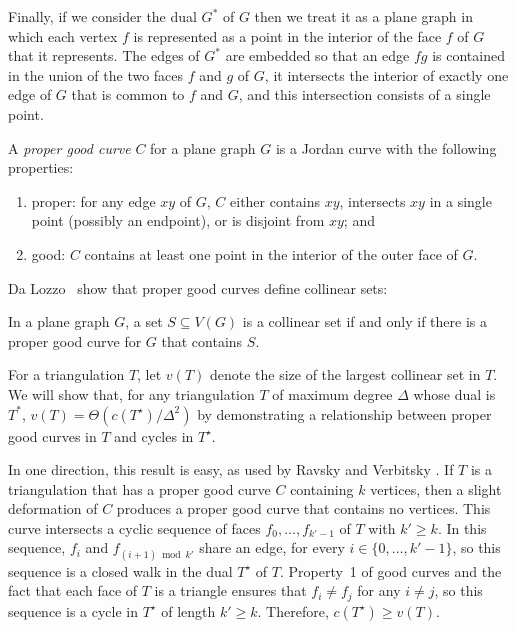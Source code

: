 \documentclass{patmorin}
\newcommand{\dual}[1]{{#1}^\star}
\begin{document}
Finally, if we consider the dual $G^*$ of $G$ then we treat it as a
plane graph in which each vertex $f$ is represented as a point in the
interior of the face $f$ of $G$ that it represents.  The edges of $G^*$
are embedded so that an edge $fg$ is contained in the union of the two
faces $f$ and $g$ of $G$, it intersects the interior of exactly one
edge of $G$ that is common to $f$ and $G$, and this intersection
consists of a single point.

A \emph{proper good curve} $C$ for a plane graph $G$ is a
Jordan curve with the following properties:
\begin{enumerate}
  \item proper: for any edge $xy$ of $G$, $C$ either contains $xy$, intersects
  $xy$ in a single point (possibly an endpoint), or is disjoint
  from $xy$; and
  \item good: $C$ contains at least one point in the interior of
  the outer face of $G$.
\end{enumerate}

Da Lozzo \etal\ show that proper good curves define collinear sets:

\begin{thm}
  In a plane graph $G$, a set $S\subseteq V(G)$ is a collinear set if
  and only if there is a proper good curve for $G$ that contains $S$.
\end{thm}

For a triangulation $T$, let $v(T)$ denote the size of the largest
collinear set in $T$.  We will show that, for any triangulation $T$
of maximum degree $\Delta$
whose dual is $T^*$, $v(T)=\Theta(c(\dual{T})/\Delta^2)$ by demonstrating a
relationship between proper good curves in $T$ and cycles in $\dual{T}$.

In one direction, this result is easy, as used by Ravsky and Verbitsky
\cite{ravsky.verbitsky:on,ravsky.verbitsky:on-arxiv}.  If $T$ is a
triangulation that has a proper good curve $C$ containing $k$ vertices,
then a slight deformation of $C$ produces a proper good curve that
contains no vertices. This curve intersects a cyclic sequence of faces
$f_0,\ldots,f_{k'-1}$ of $T$ with $k'\ge k$.  In this sequence, $f_i$ and
$f_{(i+1)\bmod k'}$ share an edge, for every $i\in\{0,\ldots,k'-1\}$, so
this sequence is a closed walk in the dual $\dual{T}$ of $T$.  Property~1
of good curves and the fact that each face of $T$ is a triangle ensures
that $f_i\neq f_j$ for any $i\neq j$, so this sequence is a cycle in
$\dual{T}$ of length $k'\ge k$.  Therefore, $c(\dual{T})\ge v(T)$.
\end{document}
